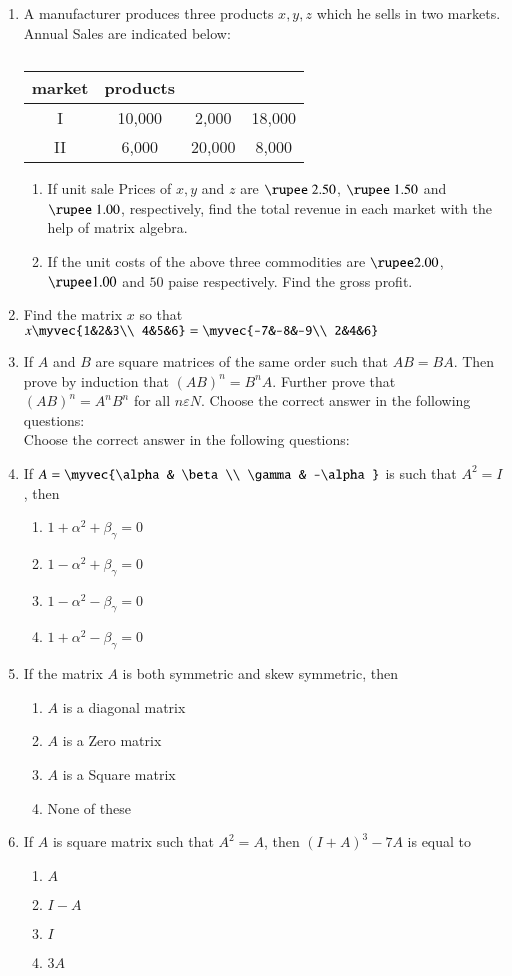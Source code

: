\documentclass{article}
\theoremstyle{remark}
\begin{document}
\begin{enumerate}
\item A manufacturer produces three products $x, y, z$ which he sells in two markets. Annual Sales are indicated below:
\begin{table}
\centering
\begin{tabular}{|c|c|c|c|}
\hline
market & products\\
\hline
I &10,000 &2,000 &18,000\\
\hline
II &6,000 &20,000 &8,000\\
\hline
\end{tabular}
\caption{}
\end{table}
\begin{enumerate}
\item If unit sale Prices of $x, y$ and $z$ are $\rupee~2.50$, $\rupee~1.50$ and $\rupee~1.00$, respectively, find the total revenue in each market with the help of matrix algebra.
\item If the unit costs of the above three commodities are $\rupee 2.00$, $\rupee 1.00$ and $50$ paise respectively. Find the gross profit.
\end{enumerate}
\item Find the matrix $x$ so that $x\myvec{1&2&3\\ 4&5&6}= \myvec{-7&-8&-9\\ 2&4&6}$
\item If $A$ and $B$ are square matrices of the same order such that $AB=BA$. Then prove by induction that $(AB)^n=B^nA$. Further prove that $(AB)^n=A^nB^n$ for all $n \varepsilon N$. Choose the correct answer in the following questions:
\\ Choose the correct answer in the following questions:
\item If $A=\myvec{\alpha& \beta \\ \gamma& -\alpha}$ is such that $A^2= I$, then
\begin{enumerate} 
\item $1+ \alpha^2+ \beta_\gamma=0$
\item $1-\alpha^2+ \beta_\gamma=0$
\item $1-\alpha^2-\beta_\gamma=0$
\item $1+\alpha^2- \beta_\gamma=0$ 
\end{enumerate}
\item If the matrix $A$ is both symmetric and skew symmetric, then
\begin{enumerate}
\item $A$ is a diagonal matrix
\item $A$ is a Zero matrix
\item $A$ is a Square matrix
\item None of these
\end{enumerate}
\item If $A$ is square matrix such that $A^2=A$, then $(I+A)^3-7A$ is equal to
\begin{enumerate}
\item $A$
\item $I-A$
\item $I$
\item $3A$
\end{enumerate}
\end{enumerate}
\end{document}
